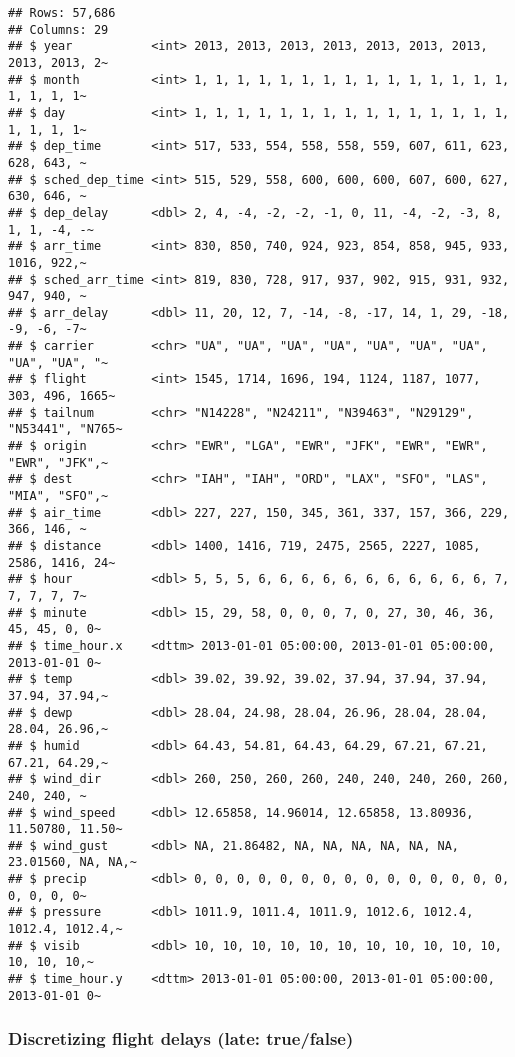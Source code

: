 \documentclass[
]{article}
\begin{document}
\begin{verbatim}
## Rows: 57,686
## Columns: 29
## $ year           <int> 2013, 2013, 2013, 2013, 2013, 2013, 2013, 2013, 2013, 2~
## $ month          <int> 1, 1, 1, 1, 1, 1, 1, 1, 1, 1, 1, 1, 1, 1, 1, 1, 1, 1, 1~
## $ day            <int> 1, 1, 1, 1, 1, 1, 1, 1, 1, 1, 1, 1, 1, 1, 1, 1, 1, 1, 1~
## $ dep_time       <int> 517, 533, 554, 558, 558, 559, 607, 611, 623, 628, 643, ~
## $ sched_dep_time <int> 515, 529, 558, 600, 600, 600, 607, 600, 627, 630, 646, ~
## $ dep_delay      <dbl> 2, 4, -4, -2, -2, -1, 0, 11, -4, -2, -3, 8, 1, 1, -4, -~
## $ arr_time       <int> 830, 850, 740, 924, 923, 854, 858, 945, 933, 1016, 922,~
## $ sched_arr_time <int> 819, 830, 728, 917, 937, 902, 915, 931, 932, 947, 940, ~
## $ arr_delay      <dbl> 11, 20, 12, 7, -14, -8, -17, 14, 1, 29, -18, -9, -6, -7~
## $ carrier        <chr> "UA", "UA", "UA", "UA", "UA", "UA", "UA", "UA", "UA", "~
## $ flight         <int> 1545, 1714, 1696, 194, 1124, 1187, 1077, 303, 496, 1665~
## $ tailnum        <chr> "N14228", "N24211", "N39463", "N29129", "N53441", "N765~
## $ origin         <chr> "EWR", "LGA", "EWR", "JFK", "EWR", "EWR", "EWR", "JFK",~
## $ dest           <chr> "IAH", "IAH", "ORD", "LAX", "SFO", "LAS", "MIA", "SFO",~
## $ air_time       <dbl> 227, 227, 150, 345, 361, 337, 157, 366, 229, 366, 146, ~
## $ distance       <dbl> 1400, 1416, 719, 2475, 2565, 2227, 1085, 2586, 1416, 24~
## $ hour           <dbl> 5, 5, 5, 6, 6, 6, 6, 6, 6, 6, 6, 6, 6, 6, 7, 7, 7, 7, 7~
## $ minute         <dbl> 15, 29, 58, 0, 0, 0, 7, 0, 27, 30, 46, 36, 45, 45, 0, 0~
## $ time_hour.x    <dttm> 2013-01-01 05:00:00, 2013-01-01 05:00:00, 2013-01-01 0~
## $ temp           <dbl> 39.02, 39.92, 39.02, 37.94, 37.94, 37.94, 37.94, 37.94,~
## $ dewp           <dbl> 28.04, 24.98, 28.04, 26.96, 28.04, 28.04, 28.04, 26.96,~
## $ humid          <dbl> 64.43, 54.81, 64.43, 64.29, 67.21, 67.21, 67.21, 64.29,~
## $ wind_dir       <dbl> 260, 250, 260, 260, 240, 240, 240, 260, 260, 240, 240, ~
## $ wind_speed     <dbl> 12.65858, 14.96014, 12.65858, 13.80936, 11.50780, 11.50~
## $ wind_gust      <dbl> NA, 21.86482, NA, NA, NA, NA, NA, NA, 23.01560, NA, NA,~
## $ precip         <dbl> 0, 0, 0, 0, 0, 0, 0, 0, 0, 0, 0, 0, 0, 0, 0, 0, 0, 0, 0~
## $ pressure       <dbl> 1011.9, 1011.4, 1011.9, 1012.6, 1012.4, 1012.4, 1012.4,~
## $ visib          <dbl> 10, 10, 10, 10, 10, 10, 10, 10, 10, 10, 10, 10, 10, 10,~
## $ time_hour.y    <dttm> 2013-01-01 05:00:00, 2013-01-01 05:00:00, 2013-01-01 0~
\end{verbatim}

\subsubsection{Discretizing flight delays (late:
true/false)}\label{discretizing-flight-delays-late-truefalse}
\end{document}
